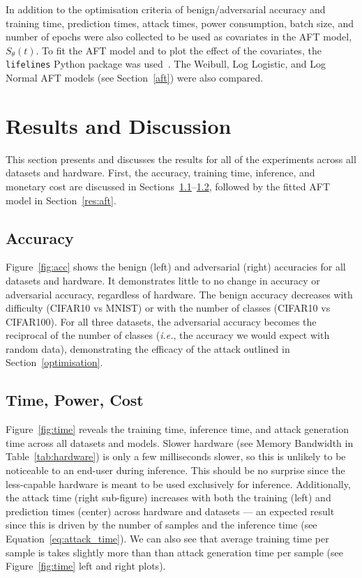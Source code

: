 \documentclass[sn-mathphys-num]{sn-jnl}%
\begin{document}
In addition to the optimisation criteria of benign/adversarial accuracy and training time, prediction times, attack times, power consumption, batch size, and number of epochs were also collected to be used as covariates in the AFT model, $S_{\theta}(t)$. To fit the AFT model and to plot the effect of the covariates, the \texttt{lifelines} Python package was used~\cite{lifelines}. The Weibull, Log Logistic, and Log Normal AFT models (see Section~\ref{aft}) were also compared.


\section{Results and Discussion}
\label{results}

This section presents and discusses the results for all of the experiments across all datasets and hardware. First, the accuracy, training time, inference, and monetary cost are discussed in Sections~\ref{res:acc}--\ref{res:cost}, followed by the fitted AFT model in Section~\ref{res:aft}.


\subsection{Accuracy}
\label{res:acc}

Figure~\ref{fig:acc} shows the benign (left) and adversarial (right) accuracies for all datasets and hardware. It demonstrates little to no change in accuracy or adversarial accuracy, regardless of hardware. The benign accuracy decreases with difficulty (CIFAR10 vs MNIST) or with the number of classes (CIFAR10 vs CIFAR100). For all three datasets, the adversarial accuracy becomes the reciprocal of the number of classes (\textit{i.e.}, the accuracy we would expect with random data), demonstrating the efficacy of the attack outlined in Section~\ref{optimisation}.



\subsection{Time, Power, Cost}
\label{res:cost}

Figure~\ref{fig:time} reveals the training time, inference time, and attack generation time across all datasets and models. Slower hardware (see Memory Bandwidth in Table~\ref{tab:hardware}) is only a few milliseconds slower, so this is unlikely to be noticeable to an end-user during inference. This should be no surprise since the less-capable hardware is meant to be used exclusively for inference. Additionally, the attack time (right sub-figure) increases with both the training (left) and prediction times (center) across hardware and datasets --- an expected result since this is driven by the number of samples and the inference time (see Equation~\ref{eq:attack_time}). We can also see that average training time per sample is takes slightly more than than attack generation time per sample (see Figure~\ref{fig:time} left and right plots).
\end{document}

